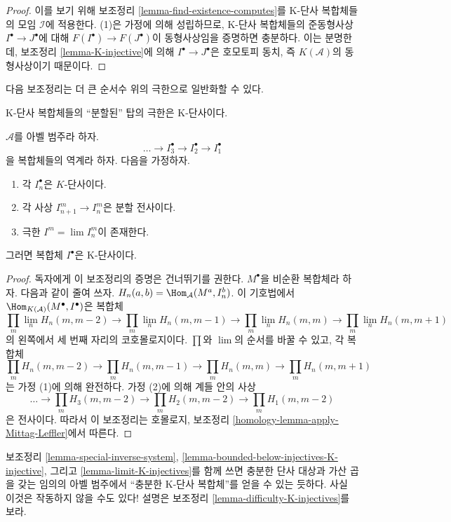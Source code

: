 \begin{proof}
이를 보기 위해 보조정리 \ref{lemma-find-existence-computes}를
K-단사 복합체들의 모임 $\mathcal{I}$에 적용한다. (1)은 가정에 의해
성립하므로, K-단사 복합체들의 준동형사상
$I^\bullet \to J^\bullet$에 대해
$F(I^\bullet) \to F(J^\bullet)$이 동형사상임을 증명하면 충분하다.
이는 분명한데, 보조정리 \ref{lemma-K-injective}에 의해
$I^\bullet \to J^\bullet$은 호모토피 동치, 즉 $K(\mathcal{A})$의
동형사상이기 때문이다.
\end{proof}

\noindent
다음 보조정리는 더 큰 순서수 위의 극한으로 일반화할 수 있다.

\begin{lemma}
\label{lemma-limit-K-injectives}
\begin{slogan}
K-단사 복합체들의 “분할된” 탑의 극한은 K-단사이다.
\end{slogan}
$\mathcal{A}$를 아벨 범주라 하자.
$$
\ldots \to I_3^\bullet \to I_2^\bullet \to I_1^\bullet
$$
을 복합체들의 역계라 하자. 다음을 가정하자.
\begin{enumerate}
\item 각 $I_n^\bullet$은 $K$-단사이다.
\item 각 사상 $I_{n + 1}^m \to I_n^m$은 분할 전사이다.
\item 극한 $I^m = \lim I_n^m$이 존재한다.
\end{enumerate}
그러면 복합체 $I^\bullet$은 K-단사이다.
\end{lemma}

\begin{proof}
독자에게 이 보조정리의 증명은 건너뛰기를 권한다.
$M^\bullet$을 비순환 복합체라 하자. 다음과 같이 줄여 쓰자.
$H_n(a, b) = \Hom_\mathcal{A}(M^a, I_n^b)$. 이 기호법에서
$\Hom_{K(\mathcal{A})}(M^\bullet, I^\bullet)$은 복합체
$$
\prod_m \lim\limits_n H_n(m, m - 2)
\to
\prod_m \lim\limits_n H_n(m, m - 1)
\to
\prod_m \lim\limits_n H_n(m, m)
\to
\prod_m \lim\limits_n H_n(m, m + 1)
$$
의 왼쪽에서 세 번째 자리의 코호몰로지이다.
$\prod$와 $\lim$의 순서를 바꿀 수 있고, 각 복합체
$$
\prod_m H_n(m, m - 2)
\to
\prod_m H_n(m, m - 1)
\to
\prod_m H_n(m, m)
\to
\prod_m H_n(m, m + 1)
$$
는 가정 (1)에 의해 완전하다. 가정 (2)에 의해 계들 안의 사상
$$
\ldots \to
\prod_m H_3(m, m - 2) \to
\prod_m H_2(m, m - 2) \to
\prod_m H_1(m, m - 2)
$$
은 전사이다. 따라서 이 보조정리는 호몰로지, 보조정리
\ref{homology-lemma-apply-Mittag-Leffler}에서 따른다.
\end{proof}

\noindent
보조정리 \ref{lemma-special-inverse-system},
\ref{lemma-bounded-below-injectives-K-injective}, 그리고
\ref{lemma-limit-K-injectives}를 함께 쓰면 충분한 단사 대상과
가산 곱을 갖는 임의의 아벨 범주에서 “충분한 K-단사 복합체”를
얻을 수 있는 듯하다. 사실 이것은 작동하지 않을 수도 있다!
설명은 보조정리 \ref{lemma-difficulty-K-injectives}를 보라.

